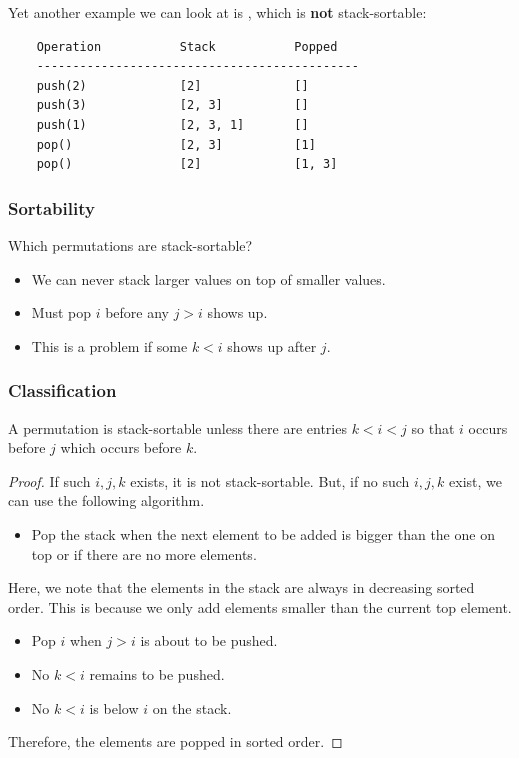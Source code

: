 \documentclass[letterpaper]{article}
\begin{document}
Yet another example we can look at is , which is \textbf{not} stack-sortable:
\begin{verbatim}
    Operation           Stack           Popped 
    ---------------------------------------------
    push(2)             [2]             []
    push(3)             [2, 3]          []
    push(1)             [2, 3, 1]       []
    pop()               [2, 3]          [1]
    pop()               [2]             [1, 3]
\end{verbatim}

\subsubsection{Sortability}
Which permutations are stack-sortable?
\begin{itemize}
    \item We can never stack larger values on top of smaller values.
    \item Must pop $i$ before any $j > i$ shows up.
    \item This is a problem if some $k < i$ shows up after $j$. 
\end{itemize}

\subsubsection{Classification}
\begin{theorem}{}{}
    A permutation is stack-sortable unless there are entries $k < i < j$ so that $i$ occurs before $j$ which occurs before $k$. 
\end{theorem}

\begin{proof}
    If such $i, j, k$ exists, it is not stack-sortable. But, if no such $i, j, k$ exist, we can use the following algorithm.
    \begin{itemize}
        \item Pop the stack when the next element to be added is bigger than the one on top or if there are no more elements. 
    \end{itemize}
    Here, we note that the elements in the stack are always in decreasing sorted order. This is because we only add elements smaller than the current top element.
    \begin{itemize}
        \item Pop $i$ when $j > i$ is about to be pushed. 
        \item No $k < i$ remains to be pushed. 
        \item No $k < i$ is below $i$ on the stack.
    \end{itemize}
    Therefore, the elements are popped in sorted order.
\end{proof}
\end{document}
